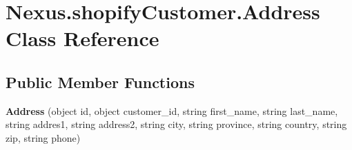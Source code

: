 \hypertarget{class_nexus_1_1shopify_customer_1_1_address}{}\section{Nexus.\+shopify\+Customer.\+Address Class Reference}
\label{class_nexus_1_1shopify_customer_1_1_address}
\subsection*{Public Member Functions}
\begin{DoxyCompactItemize}
\item 
\mbox{\label{class_nexus_1_1shopify_customer_1_1_address_a515668253d3d4b1338107e48e01cb283}} 
{\bfseries Address} (object id, object customer\+\_\+id, string first\+\_\+name, string last\+\_\+name, string addres1, string address2, string city, string province, string country, string zip, string phone)
\end{DoxyCompactItemize}
